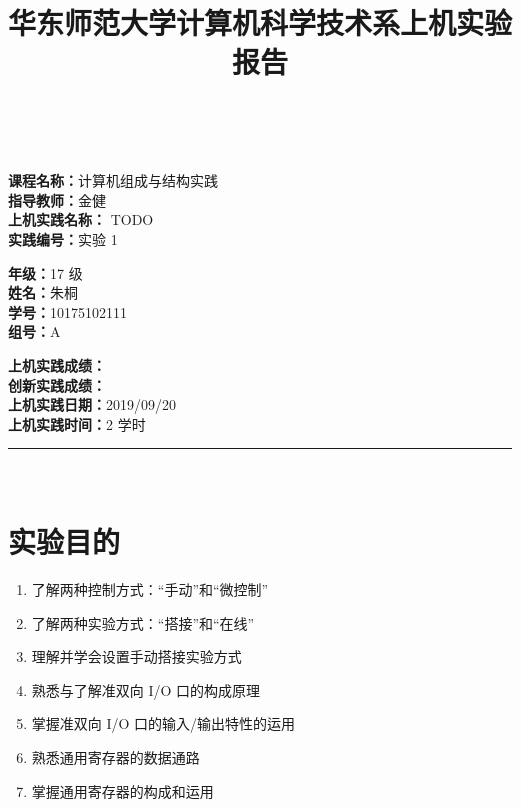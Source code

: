 \documentclass[a4paper,10pt,UTF8]{paper}
\title{华东师范大学计算机科学技术系上机实验报告}
\numberwithin{equation}{section}
\numberwithin{figure}{section}
\begin{document}
\pagestyle{fancy}
\lhead{}
\rhead{}
\makeatletter
\def\headrule{{\if@fancyplain\let\headrulewidth\plainheadrulewidth\fi%
\color{gray}\hrule\@height 0.2pt\@width\headwidth}
  \vspace{6mm}}
\makeatother

\newcommand{\HRule}{\rule{\linewidth}{1mm}}
\newcommand{\dai}{\textbf{Dais-CMX16$^+$}}

{ \\ [0.8cm]

\small{
  \begin{minipage}[t]{.32\linewidth}
    \textbf{课程名称：}计算机组成与结构实践\\
    \textbf{指导教师：}金健\\
    \textbf{上机实践名称：} TODO\\
    \textbf{实践编号：}实验 1
  \end{minipage}
  \begin{minipage}[t]{.32\linewidth}
    \textbf{年级：}17 级\\
    \textbf{姓名：}朱桐\\
    \textbf{学号：}10175102111\\
    \textbf{组号：}A
  \end{minipage} 
  \begin{minipage}[t]{.32\linewidth}
    \textbf{上机实践成绩：} \\
    \textbf{创新实践成绩：} \\
    \textbf{上机实践日期：}2019/09/20\\
    \textbf{上机实践时间：}2 学时\\
  \end{minipage}
}
\HRule \\[0.5cm]
}
\section{实验目的}

\begin{enumerate}
    \item 了解两种控制方式：“手动”和“微控制”
    \item 了解两种实验方式：“搭接”和“在线”
    \item 理解并学会设置手动搭接实验方式
    \item 熟悉与了解准双向 I/O 口的构成原理
    \item 掌握准双向 I/O 口的输入/输出特性的运用
    \item 熟悉通用寄存器的数据通路
    \item 掌握通用寄存器的构成和运用
\end{enumerate}
\end{document}
